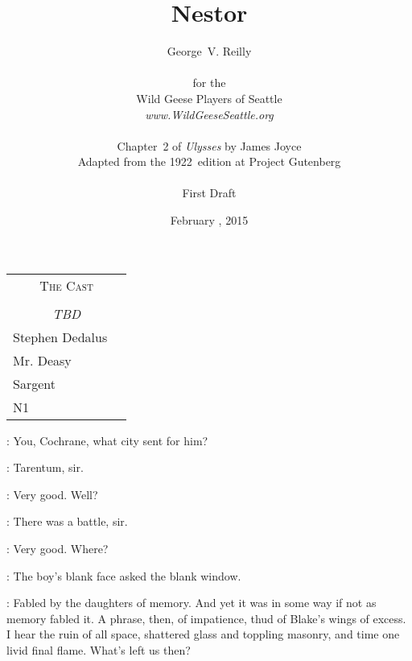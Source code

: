 



\title{\Huge Nestor}
\author{George~V. Reilly\\
\\
{\small for the}\\
Wild Geese Players of Seattle\\
{\emph{www.WildGeeseSeattle.org}}\\
\\
{\small Chapter~2 of \emph{Ulysses} by James Joyce}\\
{\small Adapted from the 1922~edition at Project Gutenberg}
\\
\\
{\small First Draft}}
\date{February , 2015}
\raggedbottom



\maketitle
\thispagestyle{empty}
\pagebreak

\begin{tabular}{lp{10cm}}
    \multicolumn{2}{c}{\Large \textsc{The Cast}} \\
\\
    \multicolumn{2}{c}{\large \textit{TBD}} \\
Stephen Dedalus \\
Mr. Deasy \\
Sargent \\
N1 \\
\end{tabular}

\thispagestyle{empty}
\newpage


\setcounter{page}{1}


\Stephen:
You, Cochrane, what city sent for him?

\cochrane:
Tarentum, sir.

\Stephen:
Very good. Well?

\cochrane:
There was a battle, sir.

\Stephen:
Very good. Where?

:
The boy's blank face asked the blank window.

\StephenInt:
Fabled by the daughters of memory. And yet it was in some way if not as
memory fabled it. A phrase, then, of impatience, thud of Blake's wings of
excess. I hear the ruin of all space, shattered glass and toppling
masonry, and time one livid final flame. What's left us then?

